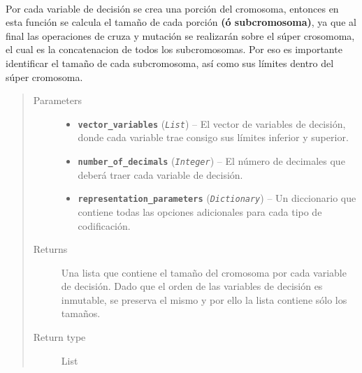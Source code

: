 \documentclass[class=report, crop=false]{standalone}
\begin{document}
\begin{fulllineitems}
~
\vspace{-0.1cm}

Por cada variable de decisión se crea una porción del cromosoma, 
entonces en esta función se calcula el tamaño de cada porción 
\textbf{(ó subcromosoma)}, ya que al final las operaciones de cruza 
y mutación se realizarán sobre el súper crosomoma, el cual es la 
concatenacion de todos los subcromosomas.\break
Por eso es importante identificar el tamaño de cada subcromosoma, 
así como sus límites dentro del súper cromosoma.

\begin{quote}\begin{description}
\item[{Parameters}] \leavevmode\begin{itemize}
\item \textbf{\texttt{vector\_variables}} (\emph{\texttt{List}}) -- El vector de variables de decisión, donde cada variable trae consigo sus límites inferior
y superior.
\item \textbf{\texttt{number\_of\_decimals}} (\emph{\texttt{Integer}}) -- El número de decimales que deberá traer cada variable de decisión.
\item \textbf{\texttt{representation\_parameters}} (\emph{\texttt{Dictionary}}) -- Un diccionario que contiene todas las opciones adicionales para cada tipo de codificación.
\end{itemize}

\item[{Returns}] \leavevmode
Una lista que contiene el tamaño del cromosoma por cada variable de 
decisión. Dado que el orden de las variables de decisión es inmutable, 
se preserva el mismo y por ello la lista contiene sólo los tamaños.
\item[{Return type}] \leavevmode
List
\end{description}\end{quote}

\end{fulllineitems}
\end{document}
